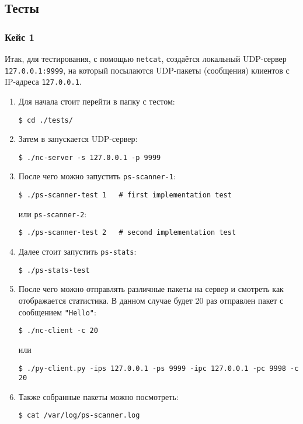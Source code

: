 \subsection{Тесты}

\subsubsection{Кейс 1}

Итак, для тестирования, с помощью \verb|netcat|, создаётся локальный UDP-сервер \verb|127.0.0.1:9999|, на который посылаются UDP-пакеты (сообщения) клиентов с IP-адреса \verb|127.0.0.1|.

\begin{enumerate}
\item Для начала стоит перейти в папку с тестом:
\begin{lstlisting}
$ cd ./tests/
\end{lstlisting}

\item Затем в запускается UDP-сервер:
\begin{lstlisting}
$ ./nc-server -s 127.0.0.1 -p 9999
\end{lstlisting}

\item После чего можно запустить \verb|ps-scanner-1|:
\begin{lstlisting}
$ ./ps-scanner-test 1   # first implementation test
\end{lstlisting}
или \verb|ps-scanner-2|:
\begin{lstlisting}
$ ./ps-scanner-test 2   # second implementation test
\end{lstlisting}

\item Далее стоит запустить \verb|ps-stats|:
\begin{lstlisting}
$ ./ps-stats-test
\end{lstlisting}

\newpage

\item После чего можно отправлять различные пакеты на сервер и смотреть как отображается статистика. В данном случае будет 20 раз отправлен пакет с сообщением \verb|"Hello"|:
\begin{lstlisting}
$ ./nc-client -c 20
\end{lstlisting}
или
\begin{lstlisting}
$ ./py-client.py -ips 127.0.0.1 -ps 9999 -ipc 127.0.0.1 -pc 9998 -c 20
\end{lstlisting}

\item Также собранные пакеты можно посмотреть:
\begin{lstlisting}
$ cat /var/log/ps-scanner.log
\end{lstlisting}

\end{enumerate}

